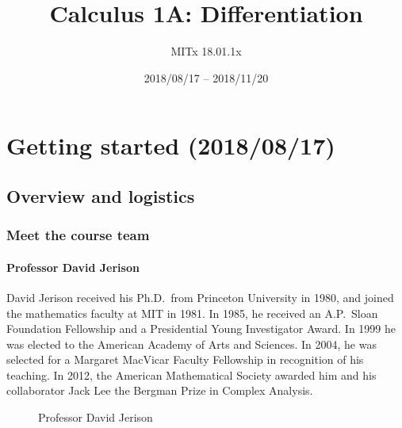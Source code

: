\documentclass[pdftex, brazil, 12pt, twoside]{article}
\begin{document}
\title{Calculus 1A: Differentiation}
\author{MITx 18.01.1x}
\date{2018/08/17 -- 2018/11/20}
\maketitle
\tableofcontents
\newpage


\section{Getting started (2018/08/17)}
\label{gs}


\subsection{Overview and logistics}
\label{gs-ol}

\subsubsection{Meet the course team}
\label{gs-ol-team}

\paragraph{Professor David Jerison}
David Jerison received his Ph.D.\ from Princeton University in 1980, and joined the mathematics faculty at MIT in 1981. In 1985, he received an A.P.\ Sloan Foundation Fellowship and a Presidential Young Investigator Award. In 1999 he was elected to the American Academy of Arts and Sciences. In 2004, he was selected for a Margaret MacVicar Faculty Fellowship in recognition of his teaching. In 2012, the American Mathematical Society awarded him and his collaborator Jack Lee the Bergman Prize in Complex Analysis.

\begin{figure}[H]
  \begin{center}
    \caption{Professor David Jerison}
    \label{fig:david-jerison}
  \end{center}
\end{figure}
\end{document}
